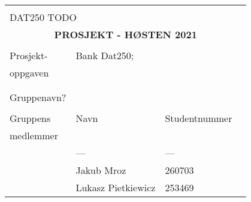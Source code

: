\documentclass[11pt,a4]{report}
\begin{document}
\setlength{\parskip}{0.5cm}   %

\pagestyle{fancyplain}
\renewcommand{\chaptermark}[1]{\markboth{#1}{#1}}
\renewcommand{\sectionmark}[1]{\markright{\thesection\ #1}}
\lhead[\fancyplain{}{\bfseries\thepage}]{\fancyplain{}{\bfseries\rightmark}}
\rhead{}
\chead{}
\cfoot{\bfseries\thepage}
\lfoot{}
\rfoot{}


\renewcommand{\lstlistingname}{Kode}%


\begin{table}[hb]
	\centering
              \begin{tabular}{|l|lll|}\hline
                \multicolumn{4}{|l|}{\hspace*{130mm}}\\
                \multicolumn{4}{|l|}{DAT250 TODO}\\[-7mm]
                \multicolumn{4}{|c|}{\Huge \bf PROSJEKT - HØSTEN 2021
                }\\[5mm]\hline
                & & &  \\[-3mm]
                Prosjekt- & \multicolumn{3}{|l|}{Bank Dat250;} \\
                oppgaven & \multicolumn{3}{|l|}{}\\[2mm]\hline
                \multicolumn{4}{c}{}\\[5mm]\hline
                & & &  \\[-3mm]
                Gruppenavn? & \multicolumn{3}{|l|}{\color{red}{AlphaBank?}} \\[2mm]\hline
                & & &\\[-3mm]
                Gruppens  & Navn &  Studentnummer & \\
                medlemmer  &   &   &  \\[2mm]
                & --- & ---     &  \\[6mm]
                & Jakub Mroz  & 260703       & \\[6mm]
                & Lukasz Pietkiewicz & 253469 & \\[20mm]
                 \hline
              \end{tabular}
\end{table}


\thispagestyle{empty}
\end{document}
